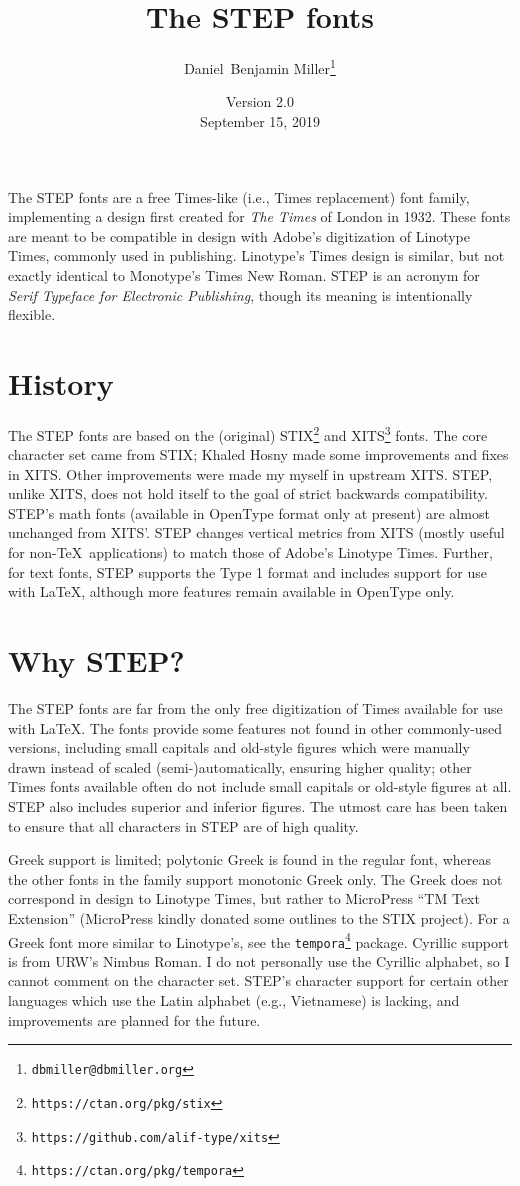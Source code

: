 \documentclass[12pt]{article}
\title{The STEP fonts}
\date{Version 2.0\\September 15, 2019}
\author{Daniel~Benjamin Miller\thanks{\texttt{dbmiller@dbmiller.org}}}
\begin{document}
\maketitle
The STEP fonts are a free Times-like (i.e., Times replacement) font family, implementing a design first created for \textit{The Times} of London in 1932. These fonts are meant to be compatible in design with Adobe's digitization of Linotype Times, commonly used in publishing. Linotype's Times design is similar, but not exactly identical to Monotype's Times New Roman. STEP is an acronym for \textit{Serif Typeface for Electronic Publishing}, though its meaning is intentionally flexible.
\section{History}
The STEP fonts are based on the (original) STIX\footnote{\texttt{https://ctan.org/pkg/stix}} and XITS\footnote{\texttt{https://github.com/alif-type/xits}} fonts. The core character set came from STIX; Khaled Hosny made some improvements and fixes in XITS. Other improvements were made my myself in upstream XITS. STEP, unlike XITS, does not hold itself to the goal of strict backwards compatibility. STEP's math fonts (available in OpenType format only at present) are almost unchanged from XITS'. STEP changes vertical metrics from XITS (mostly useful for non-\TeX\ applications) to match those of Adobe's Linotype Times. Further, for text fonts, STEP supports the Type 1 format and includes support for use with \LaTeX, although more features remain available in OpenType only.
\section{Why STEP?}
The STEP fonts are far from the only free digitization of Times available for use with \LaTeX. The fonts provide some features not found in other commonly-used versions, including small capitals and old-style figures which were manually drawn instead of scaled (semi-)automatically, ensuring higher quality; other Times fonts available often do not include small capitals or old-style figures at all. STEP also includes superior and inferior figures. The utmost care has been taken to ensure that all characters in STEP are of high quality.

Greek support is limited; polytonic Greek is found in the regular font, whereas the other fonts in the family support monotonic Greek only. The Greek does not correspond in design to Linotype Times, but rather to MicroPress ``TM Text Extension'' (MicroPress kindly donated some outlines to the STIX project). For a Greek font more similar to Linotype's, see the \texttt{tempora}\footnote{\texttt{https://ctan.org/pkg/tempora}} package. Cyrillic support is from URW's Nimbus Roman. I do not personally use the Cyrillic alphabet, so I cannot comment on the character set. STEP's character support for certain other languages which use the Latin alphabet (e.g., Vietnamese) is lacking, and improvements are planned for the future.
\end{document}
